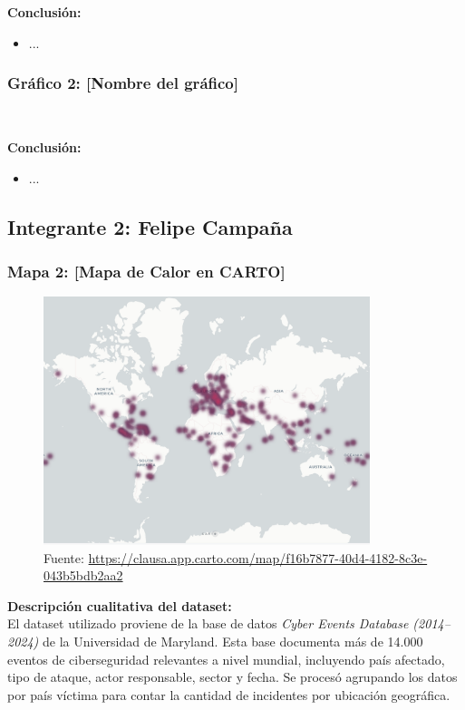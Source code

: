 \documentclass[12pt, a4paper]{article}
\begin{document}
\textbf{Conclusión:}
\begin{itemize}
    \item ...
\end{itemize}

\subsubsection*{Gráfico 2: [Nombre del gráfico]}
\begin{figure}[H]
    \
\end{figure}

\textbf{Conclusión:}
\begin{itemize}
    \item ...
\end{itemize}

\newpage
\subsection*{Integrante 2: Felipe Campaña}

\subsubsection*{Mapa 2: [Mapa de Calor en CARTO]}
\begin{figure}[H]
    \centering
    \includegraphics[width=0.85\textwidth]{images/Mapa_calor_FC.png}
    \caption[1]{Fuente: \url{https://clausa.app.carto.com/map/f16b7877-40d4-4182-8c3e-043b5bdb2aa2}}
\end{figure}

\textbf{Descripción cualitativa del dataset:} \\
El dataset utilizado proviene de la base de datos \textit{Cyber Events Database (2014–2024)} de la Universidad de Maryland. Esta base documenta más de 14.000 eventos de ciberseguridad relevantes a nivel mundial, incluyendo país afectado, tipo de ataque, actor responsable, sector y fecha. Se procesó agrupando los datos por país víctima para contar la cantidad de incidentes por ubicación geográfica.
\end{document}
